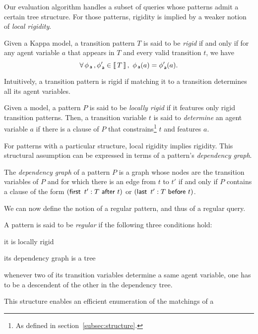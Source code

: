 \documentclass[runningheads]{llncs}
\begin{document}
Our evaluation algorithm handles a subset of queries whose
patterns admit a certain tree structure. For those patterns, rigidity
is implied by a weaker notion of \emph{local rigidity}.
\begin{definition}
  Given a Kappa model, a transition pattern $T$ is said to be
  \emph{rigid} if and only if for any agent variable $a$ that appears
  in $T$ and every valid transition $t$, we have
  \[ \forall\, \phi_{\,\textsf{a}}\,, \phi_{\,\textsf{a}}' \in \left\llbracket \, T \, \right\rrbracket, \ \phi_{\,\textsf{a}}(a)
    = \phi'_{\,\textsf{a}}(a). \]
\end{definition}
Intuitively, a transition pattern is rigid if matching it to a
transition determines all its agent variables.
\begin{definition}
  Given a model, a pattern $P$ is said to be \emph{locally rigid} if
  it features only rigid transition patterns. Then, a transition
  variable $t$ is said to \emph{determine} an agent variable $a$ if
  there is a clause of $P$ that constrains\footnote{As defined in
    section~\ref{subsec:structure}.} $t$ and features $a$.
\end{definition}
For patterns with a particular structure, local rigidity implies
rigidity. This structural assumption can be expressed in terms of a
pattern's \emph{dependency graph}.
\begin{definition}
  The \emph{dependency graph} of a pattern $P$ is a graph whose
  nodes are the transition variables of $P$ and for which there is an
  edge from $t$ to $t'$ if and only if $P$ contains a clause of the
  form
  $(\textsf{first} \,\ t':T \ \textsf{after} \ t)$ or $(\textsf{last} \,\ t':T \ \textsf{before} \ t)$.
\end{definition}
We can now define the notion of a regular pattern, and thus of a
regular query.
\begin{definition}\label{def:regularity}
  A pattern is said to be \emph{regular} if the following three
  conditions hold:
  \begin{inparaenum}[(i)]
  \item\label{reg:locally-rigid} it is locally rigid
  \item\label{reg:tree} its dependency graph is a tree
  \item\label{reg:well-captured} whenever two of its transition
    variables determine a same agent variable, one has to be a
    descendent of the other in the dependency tree.
  \end{inparaenum}
\end{definition}
This structure enables an efficient enumeration of the matchings of a
\end{document}
